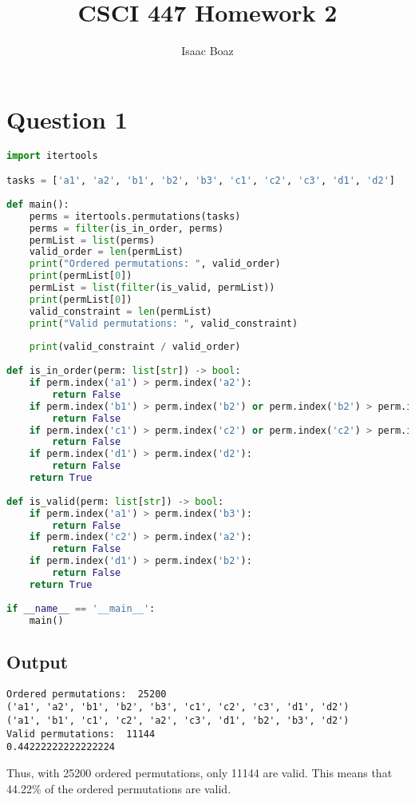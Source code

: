 \documentclass{article}
\title{CSCI 447 Homework 2}
\author{Isaac Boaz}
\begin{document}
\section*{Question 1}

\begin{lstlisting}[language=Python, showstringspaces=false]
import itertools

tasks = ['a1', 'a2', 'b1', 'b2', 'b3', 'c1', 'c2', 'c3', 'd1', 'd2']
    
def main():
    perms = itertools.permutations(tasks)
    perms = filter(is_in_order, perms)
    permList = list(perms)
    valid_order = len(permList)
    print("Ordered permutations: ", valid_order)
    print(permList[0]) 
    permList = list(filter(is_valid, permList))
    print(permList[0]) 
    valid_constraint = len(permList)
    print("Valid permutations: ", valid_constraint)
    
    print(valid_constraint / valid_order)
    
def is_in_order(perm: list[str]) -> bool:
    if perm.index('a1') > perm.index('a2'):
        return False
    if perm.index('b1') > perm.index('b2') or perm.index('b2') > perm.index('b3'):
        return False
    if perm.index('c1') > perm.index('c2') or perm.index('c2') > perm.index('c3'):
        return False
    if perm.index('d1') > perm.index('d2'):
        return False
    return True
    
def is_valid(perm: list[str]) -> bool:
    if perm.index('a1') > perm.index('b3'):
        return False
    if perm.index('c2') > perm.index('a2'):
        return False
    if perm.index('d1') > perm.index('b2'):
        return False
    return True
    
if __name__ == '__main__':
    main()
    \end{lstlisting}

\subsection*{Output}
\begin{verbatim}
Ordered permutations:  25200
('a1', 'a2', 'b1', 'b2', 'b3', 'c1', 'c2', 'c3', 'd1', 'd2')
('a1', 'b1', 'c1', 'c2', 'a2', 'c3', 'd1', 'b2', 'b3', 'd2')
Valid permutations:  11144
0.44222222222222224
\end{verbatim}

Thus, with 25200 ordered permutations, only 11144 are valid. This means that 44.22\% of the ordered permutations are valid.
\end{document}
